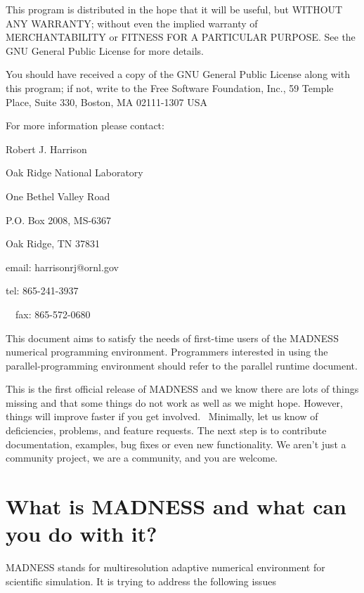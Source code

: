 \documentclass[letterpaper]{article}
\begin{document}
This program is distributed in the hope that it will be useful, but WITHOUT ANY WARRANTY; without even the implied
warranty of MERCHANTABILITY or FITNESS FOR A PARTICULAR PURPOSE. See the GNU General Public License for more details.

You should have received a copy of the GNU General Public License along with this program; if not, write to the Free
Software Foundation, Inc., 59 Temple Place, Suite 330, Boston, MA 02111-1307 USA

For more information please contact:

Robert J. Harrison

Oak Ridge National Laboratory

One Bethel Valley Road

P.O. Box 2008, MS-6367

Oak Ridge, TN 37831


\bigskip

email: harrisonrj@ornl.gov 

tel: 865-241-3937

\ \ fax: 865-572-0680

\clearpage\setcounter{page}{1}\pagestyle{Blankleftpage}
\thispagestyle{TOCfirstpage}

\bigskip

\setcounter{tocdepth}{10}
\renewcommand\contentsname{Table of Contents}
\tableofcontents

\bigskip


\bigskip


\bigskip

\clearpage\setcounter{page}{1}\pagestyle{RightPage}
\thispagestyle{Blankleftpage}

\bigskip

This document aims to satisfy the needs of first-time users of the MADNESS numerical programming environment.
Programmers interested in using the parallel-programming environment should refer to the parallel runtime document.

This is the first official release of MADNESS and we know there are lots of things missing and that some things do not
work as well as we might hope. However, things will improve faster if you get involved. \ Minimally, let us know of
deficiencies, problems, and feature requests. The next step is to contribute documentation, examples, bug fixes or even
new functionality. We aren't just a community project, we are a community, and you are welcome.

\section{What is MADNESS and what can you do with it?}
MADNESS stands for multiresolution adaptive numerical environment for scientific simulation. It is trying to address the
following issues
\end{document}

